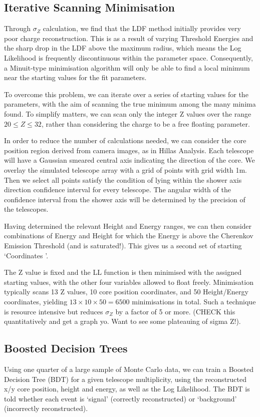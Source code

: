 \documentclass{article}
\begin{document}
\subsection{Iterative Scanning Minimisation}
Through $\sigma_{Z}$ calculation, we find that the LDF method initially provides very poor charge reconstruction. This is as a result of varying Threshold Energies and the sharp drop in the LDF above the maximum radius, which means the Log Likelihood is frequently discontinuous within the parameter space. Consequently, a Minuit-type minimisation algorithm will only be able to find a local minimum near the starting values for the fit parameters.

To overcome this problem, we can iterate over a series of starting values for the parameters, with the aim of scanning the true minimum among the many minima found. To simplify matters, we can scan only the integer Z values over the range $ 20 \leq Z \leq 32 $, rather than considering the charge to be a free floating parameter.

In order to reduce the number of calculations needed, we can consider the core position region derived from camera images, as in Hillas Analysis. Each telescope will have a Gaussian smeared central axis indicating the direction of the core. We overlay the simulated telescope array with a grid of points with grid width 1m. Then we select all points satisfy the condition of lying within the shower axis direction confidence interval for every telescope. The angular width of the confidence interval from the shower axis will be determined by the precision of the telescopes.

Having determined the relevant Height and Energy ranges, we can then consider combinations of Energy and Height for which the Energy is above the Cherenkov Emission Threshold (and is saturated!). This gives us a second set of starting \textquoteleft Coordinates \textquoteright.

The Z value is fixed and the LL function is then minimised with the assigned starting values, with the other four variables allowed to float freely. Minimisation typically scans 13 Z values, 10 core position coordinates, and 50 Height/Energy coordinates, yielding $ 13 \times 10 \times 50 = 6500$ minimisations in total. Such a technique is resource intensive but reduces $\sigma_{Z}$ by a factor of 5 or more. (CHECK this quantitatively and get a graph yo. Want to see some plateauing of sigma Z!).

\subsection{Boosted Decision Trees}
Using one quarter of a large sample of Monte Carlo data, we can train a Boosted Decision Tree (BDT) for a given telescope multiplicity, using the reconstructed x/y core position, height and energy, as well as the Log Likelihood. The BDT is told whether each event is \textquoteleft signal' (correctly reconstructed) or \textquoteleft background' (incorrectly reconstructed). 
\end{document}
